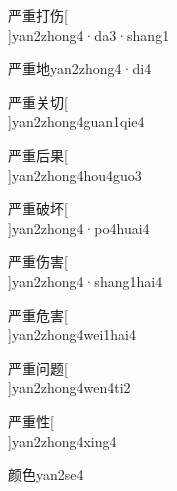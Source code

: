 \begin{verbete}[7;9;5;6]{严重打伤}[\\]{yan2zhong4·da3·shang1}
\end{verbete}

\begin{verbete}[7;9;6]{严重地}{yan2zhong4·di4}
\end{verbete}

\begin{verbete}[7;9;6;4]{严重关切}[\\]{yan2zhong4guan1qie4}
\end{verbete}

\begin{verbete}[7;9;6;8]{严重后果}[\\]{yan2zhong4hou4guo3}
\end{verbete}

\begin{verbete}[7;9;10;7]{严重破坏}[\\]{yan2zhong4·po4huai4}
\end{verbete}

\begin{verbete}[7;9;6;10]{严重伤害}[\\]{yan2zhong4·shang1hai4}
\end{verbete}

\begin{verbete}[7;9;6;10]{严重危害}[\\]{yan2zhong4wei1hai4}
\end{verbete}

\begin{verbete}[7;9;6;15]{严重问题}[\\]{yan2zhong4wen4ti2}
\end{verbete}

\begin{verbete}[7;9;8]{严重性}[\\]{yan2zhong4xing4}
\end{verbete}

\begin{verbete}[15;6]{颜色}{yan2se4}
\end{verbete}

